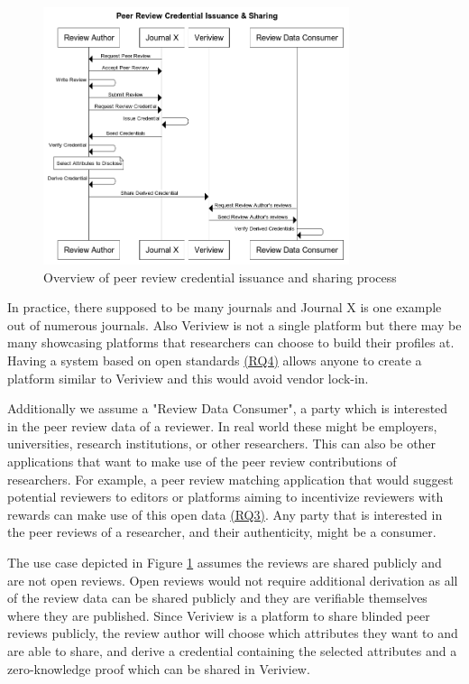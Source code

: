 \begin{figure}[htpb]
  \centering
  \includegraphics[width=0.8\textwidth]{figures/sequence.png}
  \caption{Overview of peer review credential issuance and sharing process} \label{fig:sequence1}
\end{figure}

In practice, there supposed to be many journals and Journal X is one example out of numerous journals. Also Veriview is not a single platform but there may be many showcasing platforms that researchers can choose to build their profiles at. Having a system based on open standards \hyperref[rq:open-standards]{(RQ4)} allows anyone to create a platform similar to Veriview and this would avoid vendor lock-in. 

Additionally we assume a "Review Data Consumer", a party which is interested in the peer review data of a reviewer. In real world these might be employers, universities, research institutions, or other researchers. This can also be other applications that want to make use of the peer review contributions of researchers. For example, a peer review matching application that would suggest potential reviewers to editors or platforms aiming to incentivize reviewers \parencite{TenorioFornes.2019, Jan.2018c, TrovoMassari} with rewards can make use of this open data \hyperref[rq:open-data]{(RQ3)}.  Any party that is interested in the peer reviews of a researcher, and their authenticity, might be a consumer. 

The use case depicted in Figure \ref{fig:sequence1} assumes the reviews are shared publicly and are not open reviews. Open reviews would not require additional derivation as all of the review data can be shared publicly and they are verifiable themselves where they are published. Since Veriview is a platform to share blinded peer reviews publicly, the review author will choose which attributes they want to and are able to share, and derive a credential containing the selected attributes and a zero-knowledge proof which can be shared in Veriview. 


